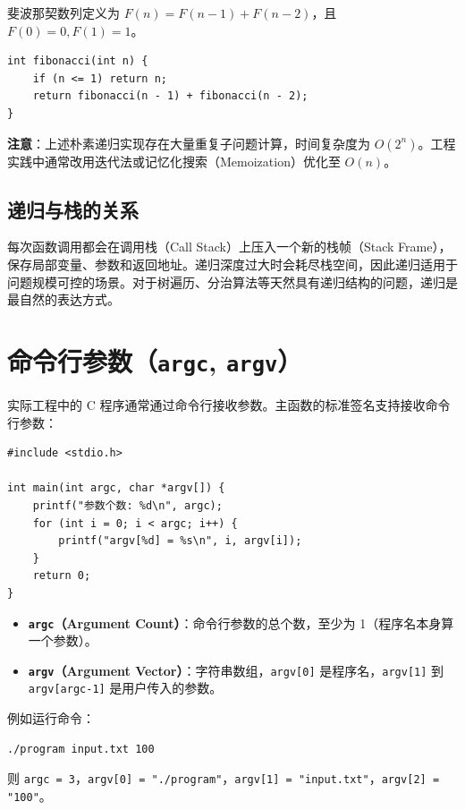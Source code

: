 斐波那契数列定义为 $F(n) = F(n-1) + F(n-2)$，且 $F(0) = 0, F(1) = 1$。

\begin{lstlisting}[caption={递归实现斐波那契}]
int fibonacci(int n) {
    if (n <= 1) return n;
    return fibonacci(n - 1) + fibonacci(n - 2);
}
\end{lstlisting}

\textbf{注意}：上述朴素递归实现存在大量重复子问题计算，时间复杂度为 $O(2^n)$。工程实践中通常改用迭代法或记忆化搜索（Memoization）优化至 $O(n)$。

\subsection{递归与栈的关系}

每次函数调用都会在调用栈（Call Stack）上压入一个新的栈帧（Stack Frame），保存局部变量、参数和返回地址。递归深度过大时会耗尽栈空间，因此递归适用于问题规模可控的场景。对于树遍历、分治算法等天然具有递归结构的问题，递归是最自然的表达方式。

\newpage

\section{命令行参数（\texttt{argc}, \texttt{argv}）}

实际工程中的 C 程序通常通过命令行接收参数。主函数的标准签名支持接收命令行参数：

\begin{lstlisting}[caption={命令行参数示例}]
#include <stdio.h>

int main(int argc, char *argv[]) {
    printf("参数个数: %d\n", argc);
    for (int i = 0; i < argc; i++) {
        printf("argv[%d] = %s\n", i, argv[i]);
    }
    return 0;
}
\end{lstlisting}

\begin{itemize}
    \item \textbf{\texttt{argc}（Argument Count）}：命令行参数的总个数，至少为 1（程序名本身算一个参数）。
    \item \textbf{\texttt{argv}（Argument Vector）}：字符串数组，\texttt{argv[0]} 是程序名，\texttt{argv[1]} 到 \texttt{argv[argc-1]} 是用户传入的参数。
\end{itemize}

例如运行命令：
\begin{lstlisting}[basicstyle=\ttfamily\footnotesize]
./program input.txt 100
\end{lstlisting}
则 \texttt{argc = 3}，\texttt{argv[0] = "./program"}，\texttt{argv[1] = "input.txt"}，\texttt{argv[2] = "100"}。
